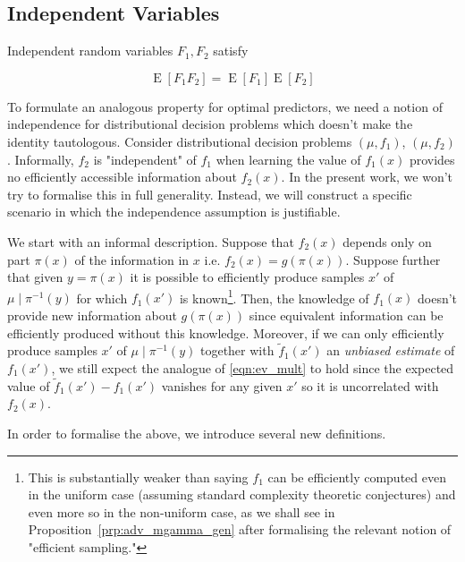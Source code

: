 \documentclass{article}
\numberwithin{equation}{section}
\theoremstyle{definition}
\theoremstyle{plain}
\DeclareMathOperator{\E}{E}
\begin{document}
\subsection{Independent Variables}

Independent random variables $F_1, F_2$ satisfy 

\begin{equation}
\label{eqn:ev_mult}
\E[F_1 F_2] = \E[F_1] \E[F_2]
\end{equation}

To formulate an analogous property for optimal predictors, we need a notion of independence for distributional decision problems which doesn't make the identity tautologous. Consider distributional decision problems $(\mu, f_1)$, $(\mu, f_2)$. Informally, $f_2$ is "independent" of $f_1$ when learning the value of $f_1(x)$ provides no efficiently accessible information about $f_2(x)$. In the present work, we won't try to formalise this in full generality. Instead, we will construct a specific scenario in which the independence assumption is justifiable.

We start with an informal description. Suppose that $f_2(x)$ depends only on part $\pi(x)$ of the information in $x$ i.e. $f_2(x) = g(\pi(x))$. Suppose further that given $y=\pi(x)$ it is possible to efficiently produce samples $x'$ of $\mu \mid \pi^{-1}(y)$ for which $f_1(x')$ is known\footnote{This is substantially weaker than saying $f_1$ can be efficiently computed even in the uniform case (assuming standard complexity theoretic conjectures) and even more so in the non-uniform case, as we shall see in Proposition~\ref{prp:adv_mgamma_gen} after formalising the relevant notion of "efficient sampling."}. Then, the knowledge of $f_1(x)$ doesn't provide new information about $g(\pi(x))$ since equivalent information can be efficiently produced without this knowledge.
 Moreover, if we can only efficiently produce samples $x'$ of $\mu \mid \pi^{-1}(y)$ together with $\tilde{f}_1(x')$ an \emph{unbiased estimate} of $f_1(x')$, we still expect the analogue of \ref{eqn:ev_mult} to hold since the expected value of $\tilde{f}_1(x') - f_1(x')$ vanishes for any given $x'$ so it is uncorrelated with $f_2(x)$.
 
In order to formalise the above, we introduce several new definitions.
\end{document}
